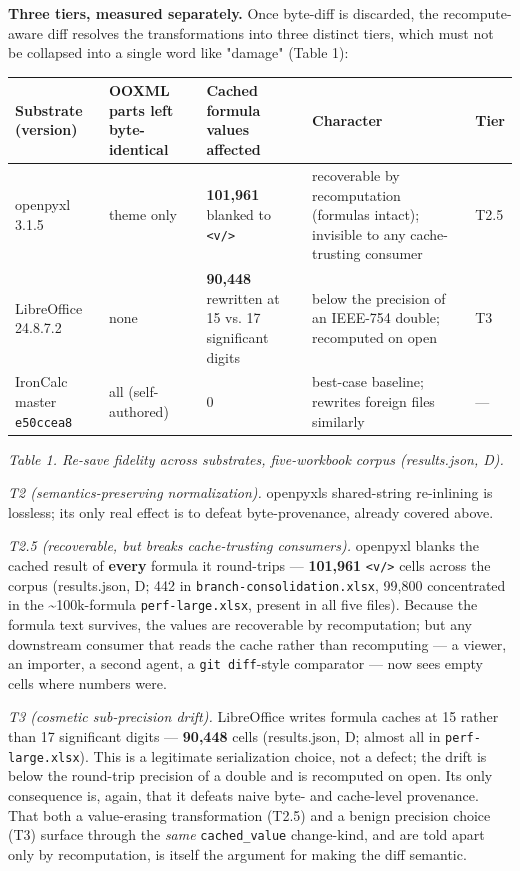 \documentclass[
]{article}
\newcounter{none} %
\begin{document}
\textbf{Three tiers, measured separately.} Once byte-diff is discarded,
the recompute-aware diff resolves the transformations into three
distinct tiers, which must not be collapsed into a single word like
"damage" (Table 1):

{\def\LTcaptype{none} %
\begin{longtable}[]{@{}lllll@{}}
\toprule\noalign{}
Substrate (version) & OOXML parts left byte-identical & Cached formula
values affected & Character & Tier \\
\midrule\noalign{}
\endhead
\bottomrule\noalign{}
\endlastfoot
openpyxl 3.1.5 & theme only & \textbf{101,961} blanked to
\texttt{\textless{}v/\textgreater{}} & recoverable by recomputation
(formulas intact); invisible to any cache-trusting consumer & T2.5 \\
LibreOffice 24.8.7.2 & none & \textbf{90,448} rewritten at 15 vs. 17
significant digits & below the precision of an IEEE-754 double;
recomputed on open & T3 \\
IronCalc master \texttt{e50ccea8} & all (self-authored) & 0 & best-case
baseline; rewrites foreign files similarly & --- \\
\end{longtable}
}

\emph{Table 1. Re-save fidelity across substrates, five-workbook corpus
(results.json, D).}

\emph{T2 (semantics-preserving normalization).}
openpyxl\textquotesingle s shared-string re-inlining is lossless; its
only real effect is to defeat byte-provenance, already covered above.

\emph{T2.5 (recoverable, but breaks cache-trusting consumers).} openpyxl
blanks the cached result of \textbf{every} formula it round-trips ---
\textbf{101,961} \texttt{\textless{}v/\textgreater{}} cells across the
corpus (results.json, D; 442 in \texttt{branch-consolidation.xlsx},
99,800 concentrated in the \textasciitilde100k-formula
\texttt{perf-large.xlsx}, present in all five files). Because the
formula text survives, the values are recoverable by recomputation; but
any downstream consumer that reads the cache rather than recomputing ---
a viewer, an importer, a second agent, a \texttt{git\ diff}-style
comparator --- now sees empty cells where numbers were.

\emph{T3 (cosmetic sub-precision drift).} LibreOffice writes formula
caches at 15 rather than 17 significant digits --- \textbf{90,448} cells
(results.json, D; almost all in \texttt{perf-large.xlsx}). This is a
legitimate serialization choice, not a defect; the drift is below the
round-trip precision of a double and is recomputed on open. Its only
consequence is, again, that it defeats naive byte- and cache-level
provenance. That both a value-erasing transformation (T2.5) and a benign
precision choice (T3) surface through the \emph{same}
\texttt{cached\_value} change-kind, and are told apart only by
recomputation, is itself the argument for making the diff semantic.
\end{document}
